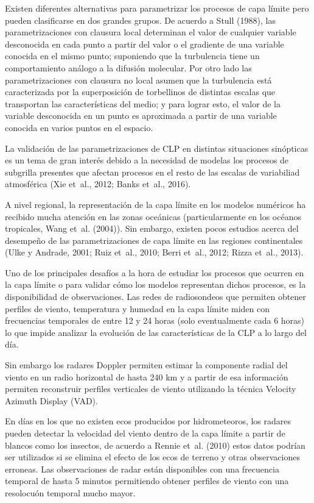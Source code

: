\documentclass[12pt,spanish,oneside]{book}
\begin{document}
Existen diferentes alternativas para parametrizar los procesos de capa
límite pero pueden clasificarse en dos grandes grupos. De acuerdo a
Stull (1988), las parametrizaciones con clausura local determinan el
valor de cualquier variable desconocida en cada punto a partir del valor
o el gradiente de una variable conocida en el mismo punto; suponiendo
que la turbulencia tiene un comportamiento análogo a la difusión
molecular. Por otro lado las parametrizaciones con clausura no local
asumen que la turbulencia está caracterizada por la superposición de
torbellinos de distintas escalas que transportan las características del
medio; y para lograr esto, el valor de la variable desconocida en un
punto es aproximada a partir de una variable conocida en varios puntos
en el espacio.

La validación de las parametrizaciones de CLP en distintas situaciones
sinópticas es un tema de gran interés debido a la necesidad de modelas
los procesos de subgrilla presentes que afectan procesos en el resto de
las escalas de variabiliad atmosférica (Xie et~al., 2012; Banks et~al.,
2016).

A nivel regional, la representación de la capa límite en los modelos
numéricos ha recibido mucha atención en las zonas oceánicas
(particularmente en los océanos tropicales, Wang et~al. (2004)). Sin
embargo, existen pocos estudios acerca del desempeño de las
parametrizaciones de capa límite en las regiones continentales (Ulke y
Andrade, 2001; Ruiz et~al., 2010; Berri et~al., 2012; Rizza et~al.,
2013).

Uno de los principales desafíos a la hora de estudiar los procesos que
ocurren en la capa límite o para validar cómo los modelos representan
dichos procesos, es la disponibilidad de observaciones. Las redes de
radiosondeos que permiten obtener perfiles de viento, temperatura y
humedad en la capa límite miden con frecuencias temporales de entre 12 y
24 horas (solo eventualmente cada 6 horas) lo que impide analizar la
evolución de las características de la CLP a lo largo del día.

Sin embargo los radares Doppler permiten estimar la componente radial
del viento en un radio horizontal de hasta 240 km y a partir de esa
información permiten reconstruir perfiles verticales de viento
utilizando la técnica Velocity Azimuth Display (VAD).

En días en los que no existen ecos producidos por hidrometeoros, los
radares pueden detectar la velocidad del viento dentro de la capa límite
a partir de blancos como los insectos, de acuerdo a Rennie et~al. (2010)
estos datos podrían ser utilizados si se elimina el efecto de los ecos
de terreno y otras observaciones erroneas. Las observaciones de radar
están disponibles con una frecuencia temporal de hasta 5 minutos
permitiendo obtener perfiles de viento con una resolocuón temporal mucho
mayor.
\end{document}

